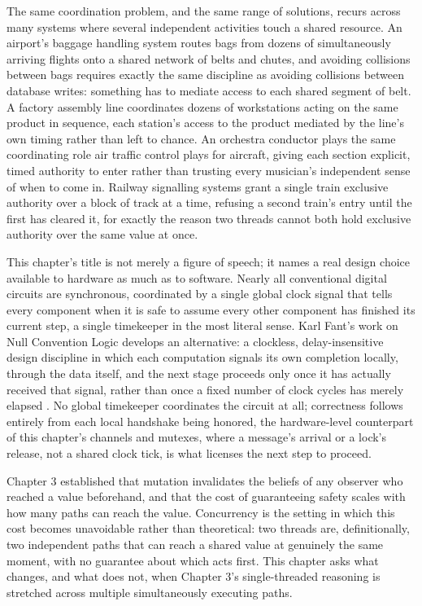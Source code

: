 \documentclass[11pt]{book}
\begin{document}
The same coordination problem, and the same range of solutions, recurs across many systems where several independent activities touch a shared resource. An airport's baggage handling system routes bags from dozens of simultaneously arriving flights onto a shared network of belts and chutes, and avoiding collisions between bags requires exactly the same discipline as avoiding collisions between database writes: something has to mediate access to each shared segment of belt. A factory assembly line coordinates dozens of workstations acting on the same product in sequence, each station's access to the product mediated by the line's own timing rather than left to chance. An orchestra conductor plays the same coordinating role air traffic control plays for aircraft, giving each section explicit, timed authority to enter rather than trusting every musician's independent sense of when to come in. Railway signalling systems grant a single train exclusive authority over a block of track at a time, refusing a second train's entry until the first has cleared it, for exactly the reason two threads cannot both hold exclusive authority over the same value at once.

This chapter's title is not merely a figure of speech; it names a real design choice available to hardware as much as to software. Nearly all conventional digital circuits are synchronous, coordinated by a single global clock signal that tells every component when it is safe to assume every other component has finished its current step, a single timekeeper in the most literal sense. Karl Fant's work on Null Convention Logic develops an alternative: a clockless, delay-insensitive design discipline in which each computation signals its own completion locally, through the data itself, and the next stage proceeds only once it has actually received that signal, rather than once a fixed number of clock cycles has merely elapsed \cite{fant2005}. No global timekeeper coordinates the circuit at all; correctness follows entirely from each local handshake being honored, the hardware-level counterpart of this chapter's channels and mutexes, where a message's arrival or a lock's release, not a shared clock tick, is what licenses the next step to proceed.

Chapter 3 established that mutation invalidates the beliefs of any observer who reached a value beforehand, and that the cost of guaranteeing safety scales with how many paths can reach the value. Concurrency is the setting in which this cost becomes unavoidable rather than theoretical: two threads are, definitionally, two independent paths that can reach a shared value at genuinely the same moment, with no guarantee about which acts first. This chapter asks what changes, and what does not, when Chapter 3's single-threaded reasoning is stretched across multiple simultaneously executing paths.
\end{document}
